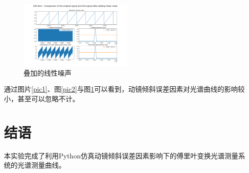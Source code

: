 \documentclass[conference]{IEEEtran}
\begin{document}
\begin{figure}[htbp]
    \centerline{\includegraphics[width=0.5\textwidth]{9.png}}
    \caption{叠加的线性噪声}
    \label{pic3}
\end{figure}


通过图片\ref{pic1}、图\ref{pic2}与图\ref{pic3}可以看到，动镜倾斜误差因素对光谱曲线的影响较小，甚至可以忽略不计。

\section{结语}
本实验完成了利用Python仿真动镜倾斜误差因素影响下的傅里叶变换光谱测量系统的光谱测量曲线。
\end{document}
